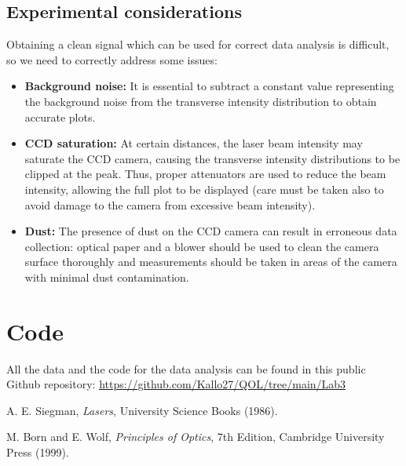 \documentclass[prl,twocolumn]{revtex4-1}
\begin{document}
\subsection{Experimental considerations}
\label{sec:appendix_exp_cons}
Obtaining a clean signal which can be used for correct data analysis is difficult, so we need to correctly address some issues:
\begin{itemize}
  \item \textbf{Background noise:}  
  It is essential to subtract a constant value representing the background noise from the transverse intensity distribution to obtain accurate plots.

  \item \textbf{CCD saturation:}  
  At certain distances, the laser beam intensity may saturate the CCD camera, causing the transverse intensity distributions to be clipped at the peak. Thus, proper attenuators are used to reduce the beam intensity, allowing the full plot to be displayed (care must be taken also to avoid damage to the camera from excessive beam intensity).

  \item \textbf{Dust:}  
  The presence of dust on the CCD camera can result in erroneous data collection: optical paper and a blower should be used to clean the camera surface thoroughly and measurements should be taken in areas of the camera with minimal dust contamination.
\end{itemize}

\section{Code}
All the data and the code for the data analysis can be found in this public Github repository: \href{https://github.com/Kallo27/QOL/tree/main/Lab3}{https://github.com/Kallo27/QOL/tree/main/Lab3}

\begin{thebibliography}{99}

  A. E. Siegman, \textit{Lasers}, University Science Books (1986).

  M. Born and E. Wolf, \textit{Principles of Optics}, 7th Edition, Cambridge University Press (1999).

\end{thebibliography}
\end{document}
